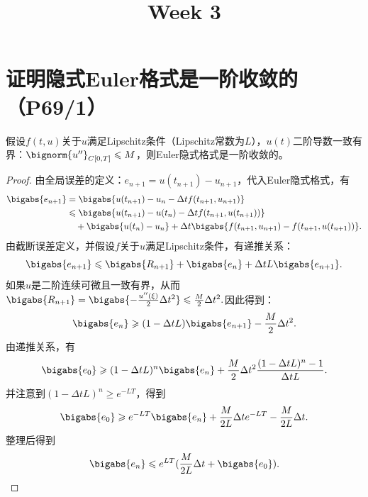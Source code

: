 \documentclass{homework}
\title{Week 3}
\date{}
\begin{document}
\maketitle
\section{证明隐式Euler格式是一阶收敛的（P69/1）}
\begin{theorem*}
    假设$f(t,u)$关于$u$满足Lipschitz条件（Lipschitz常数为$L$），$u(t)$二阶导数一致有界：$\bignorm{u''}_{C[0,T]}\leqslant M$，则Euler隐式格式是一阶收敛的。
\end{theorem*}
\begin{proof}
    由全局误差的定义：$e_{n+1}=u(t_{n+1})-u_{n+1}$，代入Euler隐式格式，有
    \begin{align*}
        \bigabs{e_{n+1}} & = \bigabs{u(t_{n+1})-u_n-\Delta tf(t_{n+1},u_{n+1})} \\
        & \leqslant\bigabs{u(t_{n+1})-u(t_n)-\Delta tf(t_{n+1},u(t_{n+1}))} \\
        & \quad+\bigabs{u(t_n)-u_n}+\Delta t\bigabs{f(t_{n+1},u_{n+1})-f(t_{n+1},u(t_{n+1}))}.
    \end{align*}
    由截断误差定义，并假设$f$关于$u$满足Lipschitz条件，有递推关系：$$\bigabs{e_{n+1}}\leqslant\bigabs{R_{n+1}}+\bigabs{e_n}+\Delta tL\bigabs{e_{n+1}}.$$
    如果$u$是二阶连续可微且一致有界，从而$\bigabs{R_{n+1}}=\bigabs{-\frac{u''(\xi)}{2}\Delta t^2}\leqslant\frac{M}{2}\Delta t^2.$因此得到：$$\bigabs{e_n}\geqslant(1-\Delta tL)\bigabs{e_{n+1}}-\frac{M}{2}\Delta t^2.$$
    由递推关系，有$$\bigabs{e_0}\geqslant(1-\Delta tL)^n\bigabs{e_n}+\frac{M}{2}\Delta t^2\frac{(1-\Delta tL)^n-1}{\Delta tL}.$$
    并注意到$(1-\Delta tL)^n\geqslant e^{-LT}$，得到$$\bigabs{e_0}\geqslant e^{-LT}\bigabs{e_n}+\frac{M}{2L}\Delta te^{-LT}-\frac{M}{2L}\Delta t.$$整理后得到$$\bigabs{e_n}\leqslant e^{LT}(\frac{M}{2L}\Delta t+\bigabs{e_0}).$$
\end{proof}
\clearpage
\end{document}

